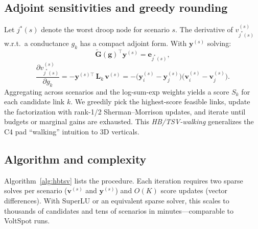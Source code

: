 \documentclass[conference]{IEEEtran}
\begin{document}
\subsection{Adjoint sensitivities and greedy rounding}
Let $j^*(s)$ denote the worst droop node for scenario $s$. The derivative of $v^{(s)}_{j^*(s)}$ w.r.t.\ a conductance $g_k$ has a compact adjoint form. With $\bm{y}^{(s)}$ solving:
\begin{equation}
 \widetilde{\bm{G}}(\bm{g})^\top \bm{y}^{(s)}=\bm{e}_{j^*(s)},
\end{equation}
\begin{equation}
 \frac{\partial v^{(s)}_{j^*(s)}}{\partial g_k}
 = -\bm{y}^{(s)\top}\,\bm{L}_k\,\bm{v}^{(s)}
 = -\big(\bm{y}^{(s)}_i-\bm{y}^{(s)}_j\big)\big(\bm{v}^{(s)}_i-\bm{v}^{(s)}_j\big).
\end{equation}
Aggregating across scenarios and the log-sum-exp weights yields a score $S_k$ for each candidate link $k$. We greedily pick the highest-score feasible links, update the factorization with rank-1/2 Sherman–Morrison updates, and iterate until budgets or marginal gains are exhausted. This \emph{HB/TSV-walking} generalizes the C4 pad “walking” intuition to 3D verticals.

\subsection{Algorithm and complexity}
Algorithm~\ref{alg:hbtsv} lists the procedure. Each iteration requires two sparse solves per scenario ($\bm{v}^{(s)}$ and $\bm{y}^{(s)}$) and $O(K)$ score updates (vector differences). With SuperLU or an equivalent sparse solver, this scales to thousands of candidates and tens of scenarios in minutes---comparable to VoltSpot runs.
\end{document}
